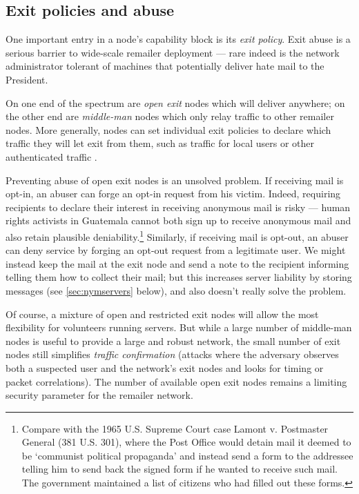 \documentclass{llncs}
\begin{document}
{\subsection{Exit policies and abuse}
\label{subsec:exitpolicies}

One important entry in a node's capability block is its \emph{exit
policy}. Exit abuse is a serious barrier to wide-scale remailer deployment
--- rare indeed is the network administrator tolerant of machines that
potentially deliver hate mail to the President.

On one end of the spectrum are \emph{open exit} nodes which will
deliver anywhere; on the other end are \emph{middle-man} nodes which
only relay traffic to other remailer nodes. More generally, nodes can
set individual exit policies to declare which traffic they will let
exit from them, such as traffic for local users or other authenticated
traffic \cite{onion-discex00}.

Preventing abuse of open exit nodes is an unsolved problem. If
receiving mail is opt-in, an abuser can forge an opt-in request from
his victim. Indeed, requiring recipients to declare their interest
in receiving anonymous mail is risky --- human rights activists in
Guatemala cannot both sign up to receive anonymous mail and also retain
plausible deniability.\footnote{
  Compare with the 1965 U.S. Supreme Court case Lamont v. Postmaster
  General (381 U.S. 301), where the Post Office would detain mail it
  deemed to be `communist political propaganda' and instead send a form
  to the addressee telling him to send back the signed form if he wanted
  to receive such mail. The government maintained a list of citizens
  who had filled out these forms.
} Similarly, if receiving mail is opt-out, an abuser can deny service
by forging an opt-out request from a legitimate user. We might instead
keep the mail at the exit node and send a note to the recipient
informing telling them how to collect their mail; but this increases
server liability by storing messages (see \ref{sec:nymservers} below),
and also doesn't really solve the problem.

Of course, a mixture of open and restricted exit nodes will allow the
most flexibility for volunteers running servers. But while a large number
of middle-man nodes is useful to provide a large and robust network, the
small number of exit nodes still simplifies \emph{traffic confirmation}
(attacks where the adversary observes both a suspected user and the
network's exit nodes and looks for timing or packet correlations). The
number of available open exit nodes remains a limiting security parameter
for the remailer network.

}
\end{document}
